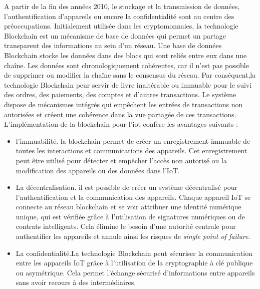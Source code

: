 A partir de la fin des années 2010, le stockage et la transmission de données, l'authentification d'appareils ou encore la confidentialité sont au centre des préoccupations. Initialement utilisée dans les cryptomonnaies, la technologie Blockchain est un mécanisme de base de données qui permet un partage transparent des informations au sein d'un réseau. Une base de données Blockchain stocke les données dans des blocs qui sont reliés entre eux dans une chaîne. Les données sont chronologiquement cohérentes, car il n'est pas possible de supprimer ou modifier la chaîne sans le consensus du réseau. Par conséquent,la technologie Blockchain peur servir de livre inaltérable ou immuable pour le suivi des ordres, des paiements, des comptes et d'autres transactions. Le système dispose de mécanismes intégrés qui empêchent les entrées de transactions non autorisées et créent une cohérence dans la vue partagée de ces transactions. L'implémentation de la blockchain pour l'iot confère les avantages suivants\cite{block} : 
\begin{itemize}
\item l'immuabilité. la blockchain permet de créer un enregistrement immuable de toutes les interactions et communications des appareils. Cet enregistrement peut être utilisé pour détecter et empêcher l'accès non autorisé ou la modification des appareils ou des données dans l'IoT.
\item La décentralisation. il est possible de créer un système décentralisé pour l’authentification et la communication des appareils. Chaque appareil IoT se connecte au réseau blockchain et se voir attribuer une identité numérique unique, qui est vérifiée grâce à l'utilisation de signatures numériques ou de contrats intelligents. Cela élimine le besoin d’une autorité centrale pour authentifier les appareils et annule ainsi les risques de \textit{single point of failure}.
\item La confidentialité.La technologie Blockchain peut sécuriser la communication entre les appareils IoT grâce à l'utilisation de la cryptographie à clé publique ou asymétrique. Cela permet l’échange sécurisé d’informations entre appareils sans avoir recours à des intermédiaires.
\end{itemize}

\vspace{0.1cm}


